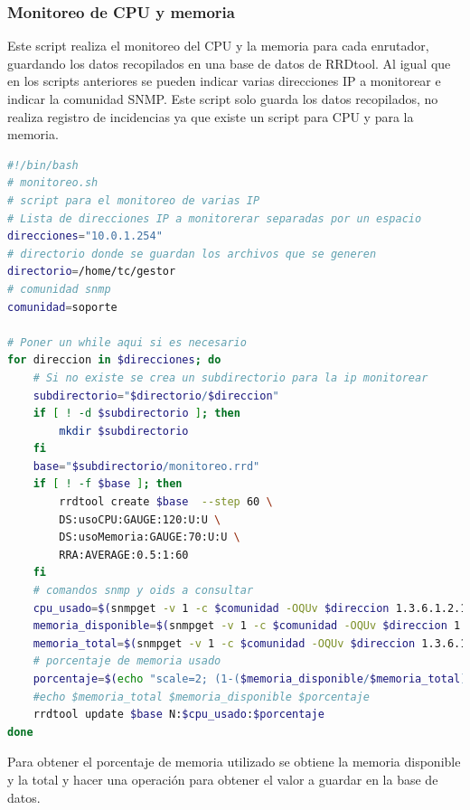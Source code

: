 \documentclass[12pt, titlepage]{article}
\begin{document}
\subsubsection{Monitoreo de CPU y memoria}
Este script realiza el monitoreo del CPU y la memoria para cada enrutador, guardando los datos recopilados en una base de datos de RRDtool. Al igual que en los scripts anteriores se pueden indicar varias direcciones IP a monitorear e indicar la comunidad SNMP. Este script solo guarda los datos recopilados, no realiza registro de incidencias ya que existe un script para CPU y para la memoria. 
\begin{lstlisting}[language=bash]
 #!/bin/bash
# monitoreo.sh
# script para el monitoreo de varias IP
# Lista de direcciones IP a monitorerar separadas por un espacio
direcciones="10.0.1.254"
# directorio donde se guardan los archivos que se generen
directorio=/home/tc/gestor
# comunidad snmp
comunidad=soporte

# Poner un while aqui si es necesario
for direccion in $direcciones; do
    # Si no existe se crea un subdirectorio para la ip monitorear
    subdirectorio="$directorio/$direccion"
    if [ ! -d $subdirectorio ]; then
        mkdir $subdirectorio
    fi
    base="$subdirectorio/monitoreo.rrd"
    if [ ! -f $base ]; then
        rrdtool create $base  --step 60 \
        DS:usoCPU:GAUGE:120:U:U \
        DS:usoMemoria:GAUGE:70:U:U \
        RRA:AVERAGE:0.5:1:60
    fi
    # comandos snmp y oids a consultar
    cpu_usado=$(snmpget -v 1 -c $comunidad -OQUv $direccion 1.3.6.1.2.1.25.3.3.1.2.768)
    memoria_disponible=$(snmpget -v 1 -c $comunidad -OQUv $direccion 1.3.6.1.4.1.2021.4.6.0)
    memoria_total=$(snmpget -v 1 -c $comunidad -OQUv $direccion 1.3.6.1.4.1.2021.4.5.0)
    # porcentaje de memoria usado
    porcentaje=$(echo "scale=2; (1-($memoria_disponible/$memoria_total))*100" | bc -l)
    #echo $memoria_total $memoria_disponible $porcentaje
    rrdtool update $base N:$cpu_usado:$porcentaje
done

\end{lstlisting}

Para obtener el porcentaje de memoria utilizado se obtiene la memoria disponible y la total y hacer una operación para obtener el valor a guardar en la base de datos.
\end{document}
